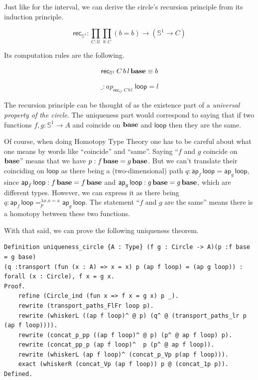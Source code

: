 \documentclass[12 pt]{amsart}
\makeatletter
\theoremstyle{definition}
\theoremstyle{remark}
\newcommand{\Type}{\mathcal{U}}
\newcommand{\base}{\mathsf{\bf base}}
\newcommand{\C}{{\mathbb{S}^1}}
\newcommand{\lo}{\mathsf{ loop}}
\newcommand{\ap}{\mathsf{ap}}
\DeclareRobustCommand{\conc}{\mathbin{\mathpalette\morphic@sqcdot\relax}}
\newcommand{\morphic@sqcdot}[2]{%
    \sbox\z@{$\m@th#1\centerdot$}%
    \ht\z@=.33333\ht\z@
    \vcenter{\box\z@}%
    }
\makeatother
\begin{document}
Just like for the interval, we can derive the circle's recursion principle from its induction principle. 

\[\mathsf{rec}_\C : \prod_{C : \Type} \prod_{b : C} (b = b) \to (\C \to C) \]

Its computation rules are the following.

\[\mathsf{rec}_\C \, C\, b\, l\, \base  \equiv b\]

\[\_ : ap_{\mathsf{rec}_\C \, C \, b\, l\,}\, \lo = l \]

The recursion principle can be thought of as the existence part of a \textit{universal property of the circle}. The uniqueness part would correspond to saying that if two functions $f,g : \C \to A$ and  coincide on $\base$ and $\lo$ then they are the same. 

Of course, when doing Homotopy Type Theory one has to be careful about what one means by words like ``coincide'' and ``same''. Saying ``$f$ and $g$ coincide on $\base$'' means that we have $p : f\, \base = g\,\base $. But we can't translate their coinciding on $\lo$ as there being a (two-dimensional) path $q : \ap_f\,\lo = \ap_g\, \lo$, since  $\ap_f\,\lo : f \,\base = f \,\base$ and   $\ap_g\,\lo : g \,\base = g \,\base$, which are different types. However, we can express it as there being $q : \ap_f\,\lo =^{\lambda x. x = x}_p \ap_g\, \lo$. The statement ``$f$ and $g$ are the same'' means there is a homotopy between these two functions.

With that said, we can prove the following uniqueness theorem.

\begin{lstlisting}
Definition uniqueness_circle {A : Type} (f g : Circle -> A)(p :f base = g base) 
(q :transport (fun (x : A) => x = x) p (ap f loop) = (ap g loop)) : 
forall (x : Circle), f x = g x. 
Proof.
    refine (Circle_ind (fun x => f x = g x) p _).
    rewrite (transport_paths_FlFr loop p).
    rewrite (whiskerL ((ap f loop)^ @ p) (q^ @ (transport_paths_lr p (ap f loop)))).
    rewrite (concat_p_pp ((ap f loop)^ @ p) (p^ @ ap f loop) p).
    rewrite (concat_pp_p (ap f loop)^  p (p^ @ ap f loop)).
    rewrite (whiskerL (ap f loop)^ (concat_p_Vp p(ap f loop))).
    exact (whiskerR (concat_Vp (ap f loop)) p @ (concat_1p p)).
Defined.
\end{lstlisting}

\end{document}
